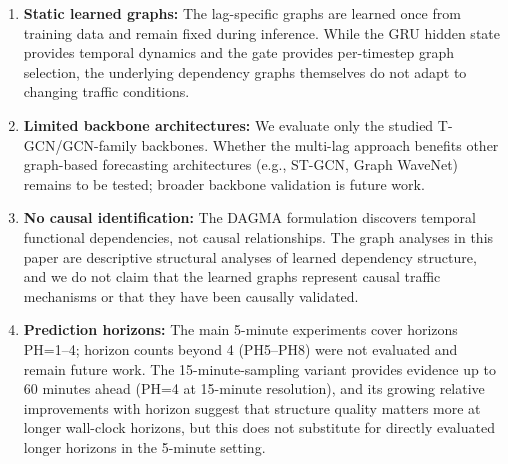 \begin{enumerate}
    \item \textbf{Static learned graphs:} The lag-specific graphs are learned once from training data and remain fixed during inference. While the GRU hidden state provides temporal dynamics and the gate provides per-timestep graph selection, the underlying dependency graphs themselves do not adapt to changing traffic conditions.

    \item \textbf{Limited backbone architectures:} We evaluate only the studied T-GCN/GCN-family backbones. Whether the multi-lag approach benefits other graph-based forecasting architectures (e.g., ST-GCN, Graph WaveNet) remains to be tested; broader backbone validation is future work.

    \item \textbf{No causal identification:} The DAGMA formulation discovers temporal functional dependencies, not causal relationships. The graph analyses in this paper are descriptive structural analyses of learned dependency structure, and we do not claim that the learned graphs represent causal traffic mechanisms or that they have been causally validated.

    \item \textbf{Prediction horizons:} The main 5-minute experiments cover horizons PH=1--4; horizon counts beyond 4 (PH5--PH8) were not evaluated and remain future work. The 15-minute-sampling variant provides evidence up to 60 minutes ahead (PH=4 at 15-minute resolution), and its growing relative improvements with horizon suggest that structure quality matters more at longer wall-clock horizons, but this does not substitute for directly evaluated longer horizons in the 5-minute setting.
\end{enumerate}
